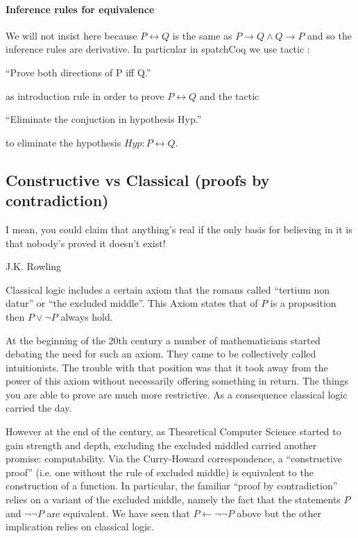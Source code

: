 \paragraph{Inference rules for equivalence}

We will not insist here because $P\leftrightarrow Q$ is the same as $P\rightarrow Q \land Q\rightarrow P$ and so the inference rules are derivative. In particular
 in spatchCoq we use  tactic :
 
``Prove both directions of P iff Q.''  

as introduction rule in order to prove $P\leftrightarrow Q$ and the  tactic 


``Eliminate the conjuction in hypothesis Hyp.'' 


to eliminate the hypothesis $Hyp: P\leftrightarrow Q$.



 





\subsection{Constructive vs Classical (proofs by contradiction)}\label{subs:Constructive vs Classical}
\epigraph{I mean, you could claim that anything's real if the only basis for believing in it is that nobody's proved it doesn't exist!} 
{J.K. Rowling}
Classical logic includes a certain axiom that the romans called ``tertium non datur'' or ``the excluded middle''. This Axiom states that of $P$ is a proposition then $P\lor \neg P$ always hold. 

 At the beginning of the 20th century a number of mathematicians started debating the need for such an axiom. They came to be collectively called intuitionists. The trouble with that position was that it took away from the power of this axiom without necessarily offering something in return. The things you are able to prove are much more restrictive. As a consequence classical logic carried the day.

However at the end of the century, as Theoretical Computer Science started to gain strength and depth, excluding the excluded middled carried another promise: computability. Via the Curry-Howard correspondence, a ``constructive proof'' (i.e. one without the rule of excluded middle) is equivalent to the construction of a function. In particular, the familiar ``proof by contradiction'' relies on a variant of the excluded middle, namely the fact that the statements $P$ and $\neg \neg P$ are equivalent. We have seen that $P \leftarrow \neg \neg P$ above but the other implication relies on classical logic.

